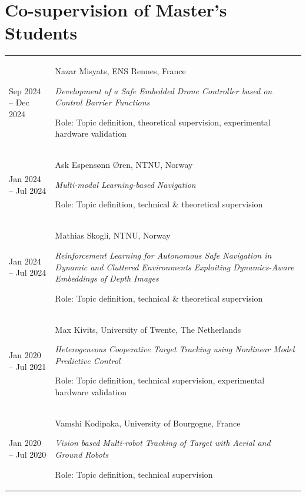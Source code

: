 \documentclass[11pt,a4paper]{article}
\newlength{\colone}
\newlength{\coltwo}
\begin{document}
\section{Co-supervision of Master's Students}
\begin{longtable}{@{}p{\colone}p{\coltwo}@{}}
	Sep 2024 -- Dec 2024
		& {Nazar Misyats, ENS Rennes, France  \par
		\small{\itshape Development of a Safe Embedded Drone Controller based on Control Barrier Functions} \par
        Role: Topic definition, theoretical supervision, experimental hardware validation}
\\
	Jan 2024 -- Jul 2024
		& {Ask Espensønn Øren, NTNU, Norway \par
		\small{\itshape Multi-modal Learning-based Navigation} \par
        Role: Topic definition, technical \& theoretical supervision}
\\
	Jan 2024 -- Jul 2024
		& {Mathias Skogli, NTNU, Norway \par
		\small{\itshape Reinforcement Learning for Autonomous Safe Navigation in Dynamic and Cluttered Environments Exploiting Dynamics-Aware Embeddings of Depth Images} \par
        Role: Topic definition, technical \& theoretical supervision}
\\
	Jan 2020 -- Jul 2021
		& {Max Kivits, University of Twente, The Netherlands \par
		\small{\itshape Heterogeneous Cooperative Target Tracking using Nonlinear Model Predictive Control} \par
        Role: Topic definition, technical supervision, experimental hardware validation}
\\
	Jan 2020 -- Jul 2020
		& {Vamshi Kodipaka, University of Bourgogne, France \par
		\small{\itshape Vision based Multi-robot Tracking of Target with Aerial and Ground Robots} \par
        Role: Topic definition, technical supervision}
\end{longtable}


\end{document}
